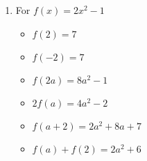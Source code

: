 \documentclass{ximera}
\begin{document}
\begin{enumerate}
\begin{multicols}{3}
\begin{itemize}
\end{itemize}
\end{multicols}

\begin{multicols}{3}
\begin{itemize}

\item  $2 f(a) = 10-4a$
\item $f(a+2) = 1-2a$
\item $f(a) + f(2) = 6-2a$

\end{itemize}
\end{multicols}

\begin{multicols}{3}
\begin{itemize}

\item  $f \left( \frac{2}{a} \right) = 5 - \frac{4}{a}$ \\
$\hphantom{f \left( \frac{2}{a} \right)} = \frac{5a-4}{a}$

\vfill

\columnbreak

\item $\frac{f(a)}{2} = \frac{5-2a}{2}$

\vfill

\columnbreak


\item  $f(a + h) = 5-2a-2h$

\end{itemize}
\end{multicols}


\item For $f(x) = 2x^2-1$

\begin{multicols}{3}
\begin{itemize}

\item  $f(2) = 7$
\item  $f(-2) = 7$
\item  $f(2a) = 8a^2-1$

\end{itemize}
\end{multicols}

\begin{multicols}{3}
\begin{itemize}

\item  $2 f(a) = 4a^2-2$
\item $f(a+2) = 2a^2+8a+7$
\item $f(a) + f(2) = 2a^2+6$


\end{itemize}
\end{multicols}
\end{enumerate}
\end{document}
